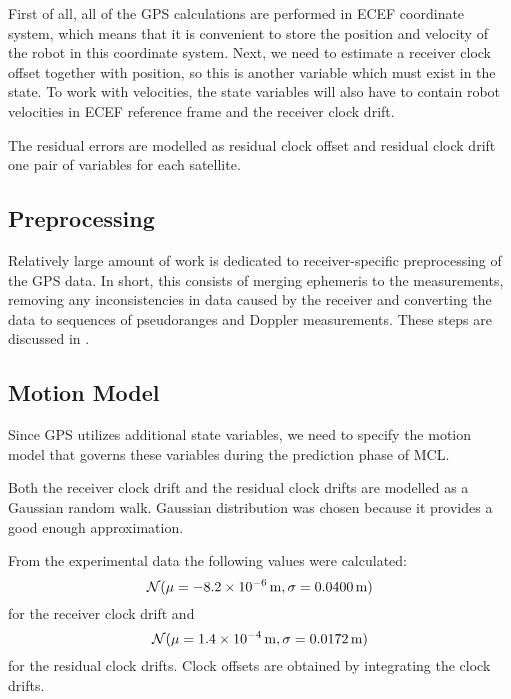 First of all, all of the GPS calculations are performed in ECEF coordinate system,
which means that it is convenient to store the position and velocity of the robot in this coordinate system.
Next, we need to estimate a receiver clock offset together
with position, so this is another variable which must exist in the state.
To work with velocities, the state variables will also have to contain robot velocities in
ECEF reference frame and the receiver clock drift.

The residual errors are modelled as residual clock offset and residual clock drift
one pair of variables for each satellite.

\subsection{Preprocessing}
Relatively large amount of work is dedicated to receiver-specific preprocessing
of the GPS data.
In short, this consists of merging ephemeris to the measurements, removing
any inconsistencies in data caused by the
receiver and converting the data to sequences of pseudoranges and Doppler measurements.
These steps are discussed in .

\subsection{Motion Model}
Since GPS utilizes additional state variables, we need to specify the motion
model that governs these variables during the prediction phase of MCL.

Both the receiver clock drift and the residual clock drifts are modelled as a Gaussian random walk.
Gaussian distribution was chosen because it provides a good enough approximation.

From the experimental data the following values were calculated:
\begin{equation}
\operatorname{\mathcal{N}}(\mu = \SI{-8.2e-06}{\meter}, \sigma = \SI{0.0400}{\meter})
\end{equation}
for the receiver clock drift and 
\begin{equation}
\operatorname{\mathcal{N}}(\mu = \SI{1.4e-4}{\meter}, \sigma = \SI{0.0172}{\meter})
\end{equation}
for the residual clock drifts.
Clock offsets are obtained by integrating the clock drifts.

